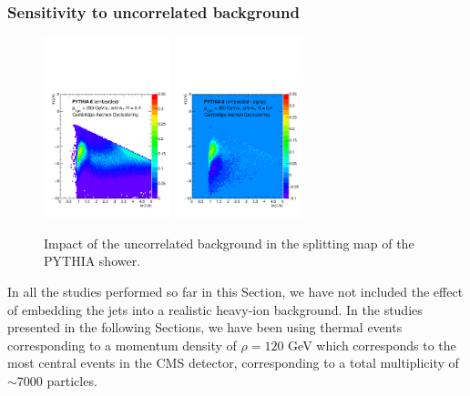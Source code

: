 \subsubsection{Sensitivity to uncorrelated background}
\label{sec:uncorrelatedbackground}

\begin{figure}[th]
\centering
\includegraphics[width=0.33\textwidth]
{figures/LundMC/FinalPlots/PythiaEmb_CA.pdf}%
\includegraphics[width=0.33\textwidth]
{figures/LundMC/FinalPlots/PythiaDiff_CA.pdf}%
\caption{Impact of the uncorrelated background in the splitting map of the PYTHIA shower.}
\label{fig:UncorrelatedBkg}
\end{figure}

In all the studies performed so far in this Section, we have not included the effect of embedding the jets into a realistic heavy-ion background. In the studies presented in the following Sections, we have been using thermal events corresponding to a momentum density of $\rho =120$ GeV which corresponds to the most central events in the CMS detector, corresponding to a total multiplicity of $\sim 7000$ particles. 

